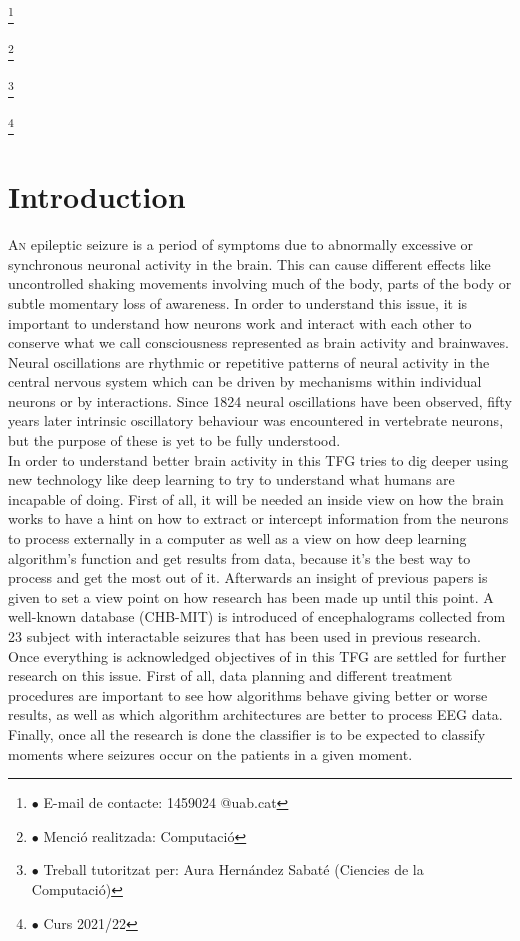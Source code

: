 ﻿\documentclass[10pt,a4paper,twocolumn,twoside]{article}
\newcommand\blfootnote[1]{%
  \begingroup
  \renewcommand\thefootnote{}\footnote{#1}%
  \addtocounter{footnote}{-1}%
  \endgroup
}
\begin{document}
\blfootnote{$\bullet$ E-mail de contacte: 1459024 @uab.cat}
\blfootnote{$\bullet$ Menció realitzada: Computació }
\blfootnote{$\bullet$ Treball tutoritzat per: Aura Hernández Sabaté (Ciencies de la Computació)}
\blfootnote{$\bullet$ Curs 2021/22}

\section{Introduction}

\lettrine[lines=3]{A}{n} epileptic seizure is a period of symptoms due to abnormally excessive or synchronous neuronal activity in the brain. This can cause different effects like uncontrolled shaking movements involving much of the body, parts of the body or subtle momentary loss of awareness. In order to understand this issue, it is important to understand how neurons work and interact with each other to conserve what we call consciousness represented as brain activity and brainwaves. 
\\
Neural oscillations are rhythmic or repetitive patterns of neural activity in the central nervous system which can be driven by mechanisms within individual neurons or by interactions. Since 1824 neural oscillations have been observed, fifty years later intrinsic oscillatory behaviour was encountered in vertebrate neurons, but the purpose of these is yet to be fully understood.
\\
In order to understand better brain activity in this TFG tries to dig deeper using new technology like deep learning to try to understand what humans are incapable of doing. First of all, it will be needed an inside view on how the brain works to have a hint on how to extract or intercept information from the neurons to process externally in a computer as well as a view on how deep learning algorithm’s function and get results from data, because it’s the best way to process and get the most out of it. Afterwards an insight of previous papers is given to set a view point on how research has been made up until this point. A well-known database (CHB-MIT)\cite{goldberger2000physiobank} is introduced of encephalograms collected from 23 subject with interactable seizures that has been used in previous research.
\\
Once everything is acknowledged objectives of in this TFG are settled for further research on this issue. First of all, data planning and different treatment procedures are important to see how algorithms behave giving better or worse results, as well as which algorithm architectures are better to process EEG data. Finally, once all the research is done the classifier is to be expected to classify moments where seizures occur on the patients in a given moment.
\\
\end{document}
